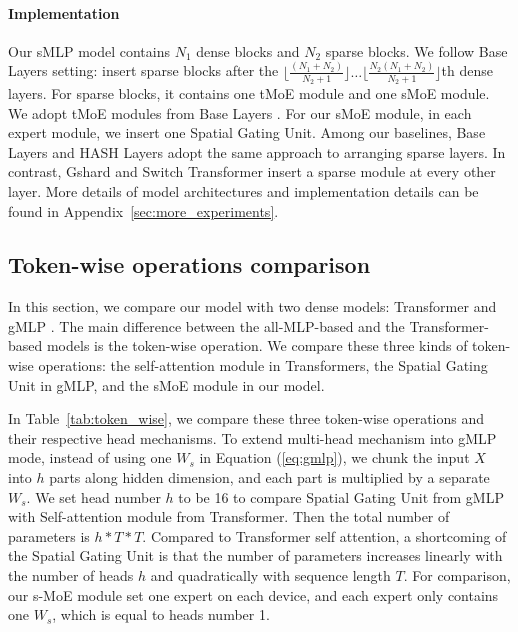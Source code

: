 \documentclass{article}
\begin{document}
\paragraph{Implementation}
Our sMLP model contains $N_1$ dense blocks and $N_2$ sparse blocks. We follow Base Layers \citep{baselayer} setting: insert sparse blocks after the $\lfloor\frac{(N_1 + N_2)}{N_2+1}\rfloor\dots\lfloor\frac{N_2 (N_1 + N_2)}{N_2+1}\rfloor$th dense layers. For sparse blocks, it contains one tMoE module and one sMoE module. We adopt tMoE modules from Base Layers \citep{baselayer}. For our sMoE module, in each expert module, we insert one Spatial Gating Unit. Among our baselines, Base Layers \citep{baselayer} and HASH Layers \citep{hashlayer} adopt the same approach to arranging sparse layers. In contrast, Gshard \citep{gshard} and Switch Transformer \citep{switch} insert a sparse module at every other layer. More details of model architectures and implementation details can be found in Appendix~\ref{sec:more_experiments}. 










\vspace{-2mm}
\subsection{Token-wise operations comparison}
\label{sec:dense_model_comparision}



In this section, we compare our model with two dense models: Transformer \citep{vaswani2017attention} and gMLP \citep{gmlp}. The main difference between the all-MLP-based and the Transformer-based models is the token-wise operation. We compare these three kinds of token-wise operations: the self-attention module in Transformers, the Spatial Gating Unit in gMLP, and the sMoE module in our model. 


In Table~\ref{tab:token_wise}, we compare these three token-wise operations and their respective head mechanisms. To extend multi-head mechanism into gMLP mode, instead of using one $W_s$ in Equation (\ref{eq:gmlp}), we chunk the input $X$ into $h$ parts along hidden dimension, and each part is multiplied by a separate $W_s$. We set head number $h$ to be 16 to compare Spatial Gating Unit from gMLP with Self-attention module from Transformer. Then the total number of parameters is $h*T*T$. Compared to Transformer self attention, a shortcoming of the Spatial Gating Unit is that the number of parameters increases linearly with the number of heads $h$ and quadratically with sequence length $T$. 
For comparison, our s-MoE module set one expert on each device, and each expert only contains one $W_s$, which is equal to heads number 1. 
\end{document}
